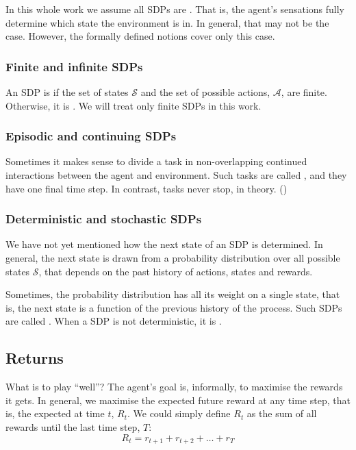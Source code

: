 In this whole work we assume all \aclp{SDP} are . That
is, the agent's sensations fully determine which state the environment is in. In
general, that may not be the case. However, the formally defined notions cover
only this case.

\subsubsection{Finite and infinite \acp{SDP}}
An \ac{SDP} is  if the set of states $\mathcal{S}$ and the
set of possible actions, $\mathcal{A}$, are finite. Otherwise, it is
. We will treat only finite \acp{SDP} in this work.

\subsubsection{Episodic and continuing \acp{SDP}}
Sometimes it makes sense to divide a task in non-overlapping continued
interactions between the agent and environment. Such tasks are called
, and they have one final time step. In contrast,
 tasks never stop, in theory.
(\cite[Section~3.3]{sutton1998introduction})

\subsubsection{Deterministic and stochastic \acp{SDP}}
We have not yet mentioned how the next state of an \ac{SDP} is determined. In
general, the next state is drawn from a probability distribution over all
possible states $\mathcal{S}$, that depends on the past history of actions,
states and rewards.

Sometimes, the probability distribution has all its weight on a single
state, that is, the next state is a function of the previous history of the
process. Such \acp{SDP} are called . When a \ac{SDP} is not
deterministic, it is .

\subsection{Returns}
What is to play ``well''? The agent's goal is, informally, to maximise the rewards it
gets. In general, we maximise the expected future reward at any time step,
that is, the expected  at time $t$, $R_t$.
We could simply define $R_t$ as the sum of all rewards until the last time step, $T$:
\begin{equation}
  R_t = r_{t+1} + r_{t+2} + \dots + r_T
  \label{eq:undiscounted-reward}
\end{equation}

